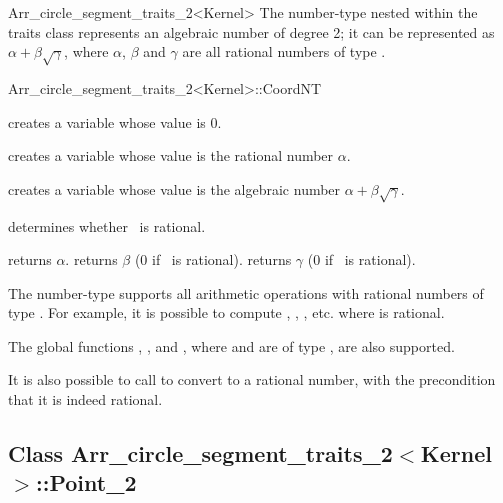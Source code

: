 \begin{ccRefClass}{Arr_circle_segment_traits_2<Kernel>}
The  number-type nested within the traits class represents
an algebraic number of degree 2; it can be represented as
$\alpha + \beta\sqrt{\gamma}$, where $\alpha$, $\beta$ and $\gamma$ are
all rational numbers of type .

\begin{ccClass}{Arr_circle_segment_traits_2<Kernel>::CoordNT}

\ccTypes


\ccCreation
{}

    {creates a variable whose value is $0$.}

    {creates a variable whose value is the rational number $\alpha$.}

    {creates a variable whose value is the algebraic number 
     $\alpha + \beta\sqrt{\gamma}$.}

\ccAccessFunctions

  {determines whether \ccVar\ is rational.}

  {returns $\alpha$.}
\ccGlue
{}
  {returns $\beta$ (0 if \ccVar\ is rational).}
\ccGlue
{}
  {returns $\gamma$ (0 if \ccVar\ is rational).}


The  number-type supports all arithmetic operations with
rational numbers of type . For example, it is possible to
compute , , , etc. where  is rational.

The global functions , ,
 and , where  and
 are of type , are also supported.

It is also possible to call  to convert  to
a rational number, with the precondition that it is indeed rational.

\end{ccClass}

\subsection*{Class 
Arr\_circle\_segment\_traits\_2$<$Kernel$>$::Point\_2}


\end{ccRefClass}
